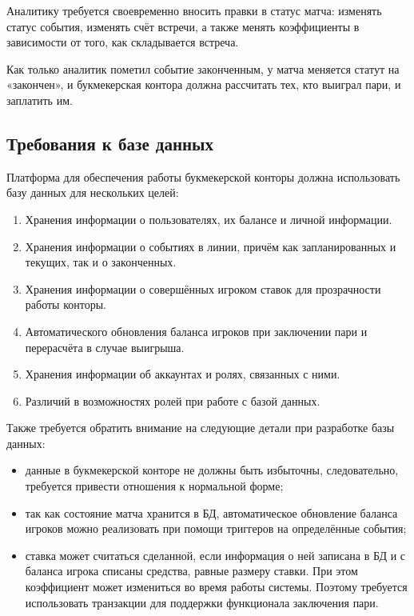 Аналитику требуется своевременно вносить правки в статус матча: изменять статус события, изменять счёт встречи, а также менять коэффициенты в зависимости от того, как складывается встреча.

Как только аналитик пометил событие законченным, у матча меняется статут на «закончен», и букмекерская контора должна рассчитать тех, кто выиграл пари, и заплатить им.

\subsection{Требования к базе данных}
Платформа для обеспечения работы букмекерской конторы должна использовать базу данных для нескольких целей:
\begin{enumerate}
	\item Хранения информации о пользователях, их балансе и личной информации.
	\item Хранения информации о событиях в линии, причём как запланированных и текущих, так и о законченных.
	\item Хранения информации о совершённых игроком ставок для прозрачности работы конторы.
	\item Автоматического обновления баланса игроков при заключении пари и перерасчёта в случае выигрыша.
	\item Хранения информации об аккаунтах и ролях, связанных с ними.
	\item Различий в возможностях ролей при работе с базой данных.
\end{enumerate}

Также требуется обратить внимание на следующие детали при разработке базы данных:
\begin{itemize}
	\item данные в букмекерской конторе не должны быть избыточны, следовательно, требуется привести отношения к нормальной форме;
	\item так как состояние матча хранится в БД, автоматическое обновление баланса игроков можно реализовать при помощи триггеров на определённые события;
	\item ставка может считаться сделанной, если информация о ней записана в БД и с баланса игрока списаны средства, равные размеру ставки. При этом коэффициент может измениться во время работы системы. Поэтому требуется использовать транзакции для поддержки функционала заключения пари.
\end{itemize}

